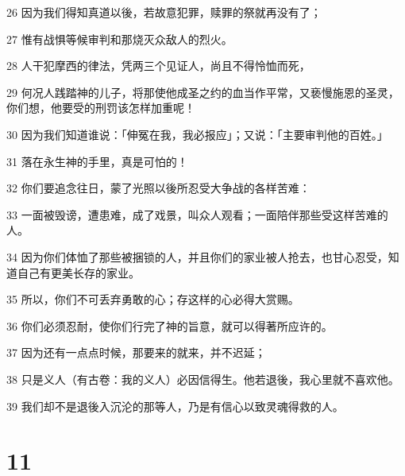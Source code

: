 \par 26 因为我们得知真道以後，若故意犯罪，赎罪的祭就再没有了；
\par 27 惟有战惧等候审判和那烧灭众敌人的烈火。
\par 28 人干犯摩西的律法，凭两三个见证人，尚且不得怜恤而死，
\par 29 何况人践踏神的儿子，将那使他成圣之约的血当作平常，又亵慢施恩的圣灵，你们想，他要受的刑罚该怎样加重呢！
\par 30 因为我们知道谁说：「伸冤在我，我必报应」；又说：「主要审判他的百姓。」
\par 31 落在永生神的手里，真是可怕的！
\par 32 你们要追念往日，蒙了光照以後所忍受大争战的各样苦难：
\par 33 一面被毁谤，遭患难，成了戏景，叫众人观看；一面陪伴那些受这样苦难的人。
\par 34 因为你们体恤了那些被捆锁的人，并且你们的家业被人抢去，也甘心忍受，知道自己有更美长存的家业。
\par 35 所以，你们不可丢弃勇敢的心；存这样的心必得大赏赐。
\par 36 你们必须忍耐，使你们行完了神的旨意，就可以得著所应许的。
\par 37 因为还有一点点时候，那要来的就来，并不迟延；
\par 38 只是义人（有古卷：我的义人）必因信得生。他若退後，我心里就不喜欢他。
\par 39 我们却不是退後入沉沦的那等人，乃是有信心以致灵魂得救的人。

\chapter{11}

